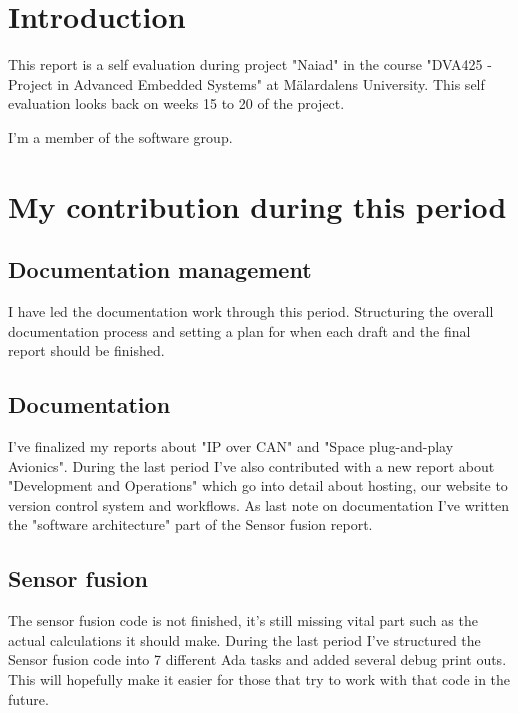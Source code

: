 \section{Introduction}
This report is a self evaluation during project "Naiad" in the course
"DVA425 - Project in Advanced Embedded Systems" at M\"{a}lardalens University.
This self evaluation looks back on weeks 15 to 20 of the project.

I'm a member of the software group.

\section{My contribution during this period}

\subsection{Documentation management}
I have led the documentation work through this period. Structuring the
overall documentation process and setting a plan for when each draft and
the final report should be finished.

\subsection{Documentation}
I've finalized my reports about "IP over CAN" and "Space plug-and-play Avionics".
During the last period I've also contributed with a new report about "Development
and Operations" which go into detail about hosting, our website to version
control system and workflows. As last note on documentation I've written
the "software architecture" part of the Sensor fusion report.

\subsection{Sensor fusion}
The sensor fusion code is not finished, it's still missing vital part such as
the actual calculations it should make. During the last period I've structured
the Sensor fusion code into 7 different Ada tasks and added several debug print
outs. This will hopefully make it easier for those that try to work with that
code in the future.

